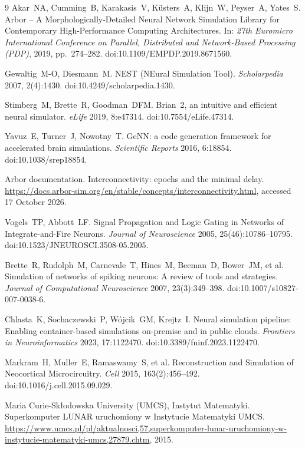 \begin{thebibliography}{9}
Akar~NA, Cumming~B, Karakasis~V, K\"usters~A, Klijn~W, Peyser~A, Yates~S.
Arbor -- A Morphologically-Detailed Neural Network Simulation Library for Contemporary High-Performance Computing Architectures.
In: \textit{27th Euromicro International Conference on Parallel, Distributed and Network-Based Processing (PDP)}, 2019, pp.~274--282. doi:10.1109/EMPDP.2019.8671560.

Gewaltig~M-O, Diesmann~M.
NEST (NEural Simulation Tool).
\textit{Scholarpedia} 2007, 2(4):1430. doi:10.4249/scholarpedia.1430.

Stimberg~M, Brette~R, Goodman~DFM.
Brian~2, an intuitive and efficient neural simulator.
\textit{eLife} 2019, 8:e47314. doi:10.7554/eLife.47314.

Yavuz~E, Turner~J, Nowotny~T.
GeNN: a code generation framework for accelerated brain simulations.
\textit{Scientific Reports} 2016, 6:18854. doi:10.1038/srep18854.

Arbor documentation. Interconnectivity: epochs and the minimal delay.
\url{https://docs.arbor-sim.org/en/stable/concepts/interconnectivity.html}, accessed 17 October 2026.

Vogels~TP, Abbott~LF.
Signal Propagation and Logic Gating in Networks of Integrate-and-Fire Neurons.
\textit{Journal of Neuroscience} 2005, 25(46):10786--10795. doi:10.1523/JNEUROSCI.3508-05.2005.

Brette~R, Rudolph~M, Carnevale~T, Hines~M, Beeman~D, Bower~JM, et al.
Simulation of networks of spiking neurons: A review of tools and strategies.
\textit{Journal of Computational Neuroscience} 2007, 23(3):349--398. doi:10.1007/s10827-007-0038-6.

Chlasta~K, Sochaczewski~P, W\'ojcik~GM, Krejtz~I.
Neural simulation pipeline: Enabling container-based simulations on-premise and in public clouds.
\textit{Frontiers in Neuroinformatics} 2023, 17:1122470. doi:10.3389/fninf.2023.1122470.

Markram~H, Muller~E, Ramaswamy~S, et al.
Reconstruction and Simulation of Neocortical Microcircuitry.
\textit{Cell} 2015, 163(2):456--492. doi:10.1016/j.cell.2015.09.029.

Maria Curie-Sk{\l}odowska University (UMCS), Instytut Matematyki.
Superkomputer LUNAR uruchomiony w Instytucie Matematyki UMCS.
\url{https://www.umcs.pl/pl/aktualnosci,57,superkomputer-lunar-uruchomiony-w-instytucie-matematyki-umcs,27879.chtm}, 2015.

\end{thebibliography}
